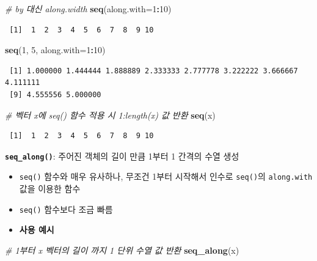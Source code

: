 \documentclass[
  11pt,
]{krantz}
\newenvironment{Shaded}{\begin{snugshade}}{\end{snugshade}}
\newcommand{\CommentTok}[1]{\textcolor[rgb]{0.37,0.37,0.37}{\textit{#1}}}
\newcommand{\DataTypeTok}[1]{\textcolor[rgb]{0.27,0.27,0.27}{#1}}
\newcommand{\DecValTok}[1]{\textcolor[rgb]{0.06,0.06,0.06}{#1}}
\newcommand{\KeywordTok}[1]{\textcolor[rgb]{0.27,0.27,0.27}{\textbf{#1}}}
\newcommand{\NormalTok}[1]{#1}
\newcommand{\OperatorTok}[1]{\textcolor[rgb]{0.43,0.43,0.43}{\textbf{#1}}}
\providecommand{\tightlist}{%
  \setlength{\itemsep}{0pt}\setlength{\parskip}{0pt}}
\begin{document}
\begin{Shaded}
\begin{Highlighting}[]
\CommentTok{# by 대신 along.width }
\KeywordTok{seq}\NormalTok{(}\DataTypeTok{along.with=}\DecValTok{1}\OperatorTok{:}\DecValTok{10}\NormalTok{)}
\end{Highlighting}
\end{Shaded}

\begin{verbatim}
 [1]  1  2  3  4  5  6  7  8  9 10
\end{verbatim}

\begin{Shaded}
\begin{Highlighting}[]
\KeywordTok{seq}\NormalTok{(}\DecValTok{1}\NormalTok{, }\DecValTok{5}\NormalTok{, }\DataTypeTok{along.with=}\DecValTok{1}\OperatorTok{:}\DecValTok{10}\NormalTok{)}
\end{Highlighting}
\end{Shaded}

\begin{verbatim}
 [1] 1.000000 1.444444 1.888889 2.333333 2.777778 3.222222 3.666667 4.111111
 [9] 4.555556 5.000000
\end{verbatim}

\begin{Shaded}
\begin{Highlighting}[]
\CommentTok{# 벡터 x에 seq() 함수 적용 시 1:length(x) 값 반환}
\KeywordTok{seq}\NormalTok{(x)}
\end{Highlighting}
\end{Shaded}

\begin{verbatim}
 [1]  1  2  3  4  5  6  7  8  9 10
\end{verbatim}

\normalsize

\textbf{\texttt{seq\_along()}}: 주어진 객체의 길이 만큼 1부터 1 간격의 수열 생성

\begin{itemize}
\tightlist
\item
  \texttt{seq()} 함수와 매우 유사하나, 무조건 1부터 시작해서 인수로 \texttt{seq()}의 \texttt{along.with} 값을 이용한 함수
\item
  \texttt{seq()} 함수보다 조금 빠름
\item
  \textbf{사용 예시}
\end{itemize}

\footnotesize

\begin{Shaded}
\begin{Highlighting}[]
\CommentTok{# 1부터 x 벡터의 길이 까지 1 단위 수열 값 반환}
\KeywordTok{seq_along}\NormalTok{(x)}
\end{Highlighting}
\end{Shaded}
\end{document}
